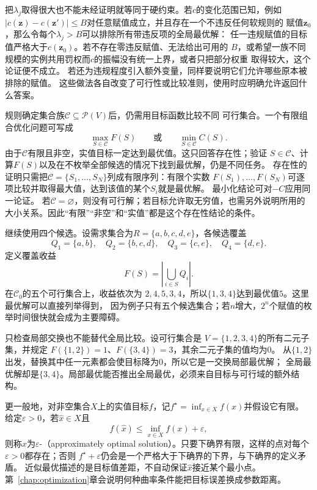 把$\lambda_j$取得很大也不能未经证明就等同于硬约束。若$c$的变化范围已知，例如
$|c(\bm{z})-c(\bm{z}')|\leq B$对任意赋值成立，并且存在一个不违反任何软规则的
赋值$\bm{z}_0$，那么令每个$\lambda_j>B$可以排除所有带违反项的全局最优解：
任一违规赋值的目标值严格大于$c(\bm{z}_0)$。若不存在零违反赋值、无法给出可用的
$B$，或希望一族不同规模的实例共用罚权而$c$的振幅没有统一上界，或者只把部分权重
取得较大，这个论证便不成立。
若还为违规程度引入额外变量，同样要说明它们允许哪些原本被排除的赋值。
这些做法各自改变了可行性或比较准则，使用时应明确允许返回什么答案。

规则确定集合族$\mathcal{C}\subseteq\mathcal{P}(V)$后，仍需用目标函数比较不同
可行集合。一个有限组合优化问题可写成
\begin{equation}
  \max_{S\in\mathcal{C}}F(S)
  \qquad\text{或}\qquad
  \min_{S\in\mathcal{C}}C(S).
  \label{eq:comb-discrete-optimization}
\end{equation}
由于$\mathcal{C}$有限且非空，实值目标一定达到最优值。这只回答存在性；验证
$S\in\mathcal{C}$、计算$F(S)$以及在不枚举全部候选的情况下找到最优解，仍是不同任务。
存在性的证明只需把$\mathcal{C}=\{S_1,\ldots,S_N\}$列成有限序列：有限个实数
$F(S_1),\ldots,F(S_N)$可逐项比较并取得最大值，达到该值的某个$S_i$就是最优解。
最小化结论可对$-C$应用同一论证。
若$\mathcal{C}=\varnothing$，则没有可行解；若目标允许取无穷值，也需另外说明所用的
大小关系。因此“有限”“非空”和“实值”都是这个存在性结论的条件。

继续使用四个候选。设需求集合为$R=\{a,b,c,d,e\}$，各候选覆盖
\[
  Q_1=\{a,b\},\quad
  Q_2=\{b,c,d\},\quad
  Q_3=\{c,e\},\quad
  Q_4=\{d,e\}.
\]
定义覆盖收益
\begin{equation}
  F(S)=\left|\bigcup_{i\in S}Q_i\right|.
  \label{eq:comb-running-coverage}
\end{equation}
在$\mathcal{C}_0$的五个可行集合上，收益依次为
$2,4,5,3,4$，所以$\{1,3,4\}$达到最优值$5$。这里最优解可以直接列举得到，
因为例子只有五个候选集合；若$n$增大，$2^n$个赋值的枚举时间很快就会成为主要障碍。

只检查局部交换也不能替代全局比较。设可行集合是
$V=\{1,2,3,4\}$的所有二元子集，并规定
$F(\{1,2\})=1$、$F(\{3,4\})=3$，其余二元子集的值均为$0$。
从$\{1,2\}$出发，替换其中任一元素都会使目标降为$0$，所以它是一交换局部最优解；
全局最优解却是$\{3,4\}$。局部最优能否推出全局最优，必须来自目标与可行域的额外结构。

更一般地，对非空集合$X$上的实值目标$f$，记$f^\star=\inf_{x\in X}f(x)$并假设它有限。
给定$\varepsilon>0$，若$\widehat x\in X$且
\begin{equation}
  f(\widehat{x})\leq \inf_{x\in X}f(x)+\varepsilon,
  \label{eq:prelim-epsilon-optimal}
\end{equation}
则称$\widehat{x}$为$\varepsilon$-（approximately optimal
solution）。只要下确界有限，这样的点对每个$\varepsilon>0$都存在；否则
$f^\star+\varepsilon$仍会是一个严格大于下确界的下界，与下确界的定义矛盾。
近似最优描述的是目标值差距，不自动保证$\widehat{x}$接近某个最小点。第~\ref{chap:optimization}章会说明何种曲率条件能把目标误差换成参数距离。

